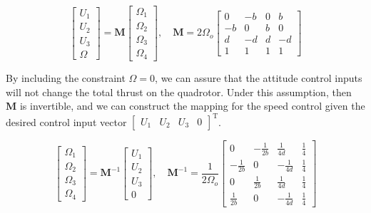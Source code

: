 \documentclass[12pt]{article}
\begin{document}
\begin{equation}
  \label{eq:controls}
  \begin{bmatrix}
  U_1 \\ U_2 \\ U_3 \\ \Omega
  \end{bmatrix} = \mathbf{M}
  \begin{bmatrix}
  \Omega_1 \\ \Omega_2 \\ \Omega_3 \\ \Omega_4
  \end{bmatrix},\quad \mathbf{M} = 2\Omega_o
  \begin{bmatrix}
  0 & -b & 0 & b \\ 
  -b & 0 & b & 0 \\ 
  d & -d & d & -d \\
  1 & 1 & 1 & 1
  \end{bmatrix}
\end{equation}

By including the constraint $ \Omega = 0 $, we can assure that the attitude control inputs will not change the total thrust on the quadrotor. Under this assumption, then $ \mathbf{M} $ is invertible, and we can construct the mapping for the speed control given the desired control input vector $ \begin{bmatrix} U_1  & U_2 & U_3 & 0\end{bmatrix}^\mathrm{T} $.

\begin{equation}
    \begin{bmatrix}
    \Omega_1 \\ \Omega_2 \\ \Omega_3 \\ \Omega_4
    \end{bmatrix} = 
    \mathbf{M}^{-1} \begin{bmatrix} U_1 \\ U_2 \\ U_3 \\ 0 \end{bmatrix},\quad
    \mathbf{M}^{-1} = \frac{1}{2 \Omega_o}
    \begin{bmatrix}
    0 & -\frac{1}{2b} & \frac{1}{4d} & \frac{1}{4} \\ 
    -\frac{1}{2b} & 0 & -\frac{1}{4d} & \frac{1}{4} \\ 
    0 & \frac{1}{2b} & \frac{1}{4d} & \frac{1}{4} \\
    \frac{1}{2b} & 0 & -\frac{1}{4d} & \frac{1}{4}
    \end{bmatrix}
\end{equation}
\end{document}
